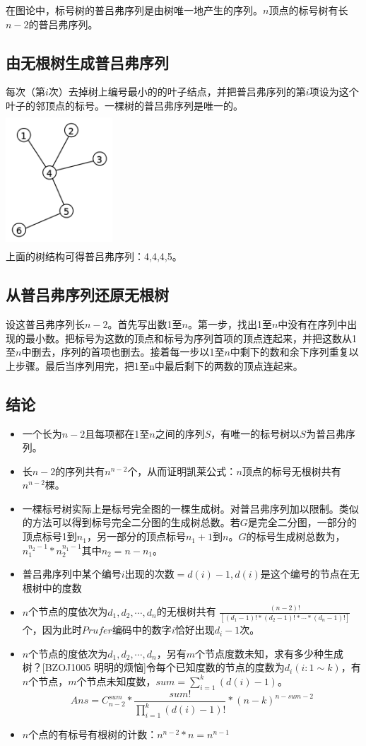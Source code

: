 在图论中，标号树的普吕弗序列是由树唯一地产生的序列。$n$顶点的标号树有长$n − 2$的普吕弗序列。
\subsection{由无根树生成普吕弗序列}
每次（第$i$次）去掉树上编号最小的的叶子结点，并把普吕弗序列的第$i$项设为这个叶子的邻顶点的标号。一棵树的普吕弗序列是唯一的。 \\
\includegraphics[height = 5cm,width = 4cm]{prufer.png}\\
上面的树结构可得普吕弗序列：{4,4,4,5}。

\subsection{从普吕弗序列还原无根树}
设这普吕弗序列长$n − 2$。首先写出数1至$n$。第一步，找出1至$n$中没有在序列中出现的最小数。把标号为这数的顶点和标号为序列首项的顶点连起来，并把这数从1至$n$中删去，序列的首项也删去。接着每一步以1至$n$中剩下的数和余下序列重复以上步骤。最后当序列用完，把1至n中最后剩下的两数的顶点连起来。

\subsection{结论}
\begin{itemize}
\item 一个长为$n−2$且每项都在1至$n$之间的序列$S$，有唯一的标号树以$S$为普吕弗序列。
\item 长$n−2$的序列共有$n^{n−2}$个，从而证明凯莱公式：$n$顶点的标号无根树共有$n^{n−2}$棵。
\item 一棵标号树实际上是标号完全图的一棵生成树。对普吕弗序列加以限制。类似的方法可以得到标号完全二分图的生成树总数。若$G$是完全二分图，一部分的顶点标号1到$n_1$，另一部分的顶点标号$n_{1} + 1$到$n$。$G$的标号生成树总数为，$n_{1}^{n_{2}-1}*n_{2}^{n_{1}-1}$其中$n_{2} = n − n_1$。
\item 普吕弗序列中某个编号$i$出现的次数$=d(i)-1,d(i)$是这个编号的节点在无根树中的度数
\item $n$个节点的度依次为$d_1, d_2,\cdots , d_n$的无根树共有 $ \frac{(n-2)!} {[ (d_1-1)!*(d_2-1)!*\cdots *(d_n-1)! ] }$个，因为此时$Prufer$编码中的数字$i$恰好出现$d_i-1$次。
\item $n$个节点的度依次为$d_1, d_2,\cdots , d_n$，另有$m$个节点度数未知，求有多少种生成树？[BZOJ1005 明明的烦恼]令每个已知度数的节点的度数为$d_i(i:1\sim k)$，有$n$个节点，$m$个节点未知度数，$sum=\sum_{i=1}^{k}(d(i)-1)$。
$$
Ans=C_{n-2}^{sum}*\frac{sum!}{\prod_{i=1}^{k}(d(i)-1)!}*(n-k)^{n-sum-2}
$$

\item $n$个点的有标号有根树的计数：$n^{n-2}*n = n^{n-1}$
\end{itemize}
